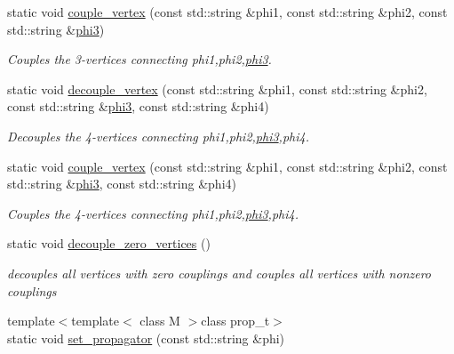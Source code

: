 \begin{DoxyCompactItemize}
static void \hyperlink{a00372_a1ada7c0d83308877cd41c28cf1c89be0}{couple\+\_\+vertex} (const std\+::string \&phi1, const std\+::string \&phi2, const std\+::string \&\hyperlink{a00424}{phi3})
\begin{DoxyCompactList}\small\item\em Couples the 3-\/vertices connecting phi1,phi2,\hyperlink{a00424}{phi3}. \end{DoxyCompactList}\item 
\hypertarget{a00372_a01e88fa34516f9679d742f11856f4611}{}static void \hyperlink{a00372_a01e88fa34516f9679d742f11856f4611}{decouple\+\_\+vertex} (const std\+::string \&phi1, const std\+::string \&phi2, const std\+::string \&\hyperlink{a00424}{phi3}, const std\+::string \&phi4)\label{a00372_a01e88fa34516f9679d742f11856f4611}

\begin{DoxyCompactList}\small\item\em Decouples the 4-\/vertices connecting phi1,phi2,\hyperlink{a00424}{phi3},phi4. \end{DoxyCompactList}\item 
\hypertarget{a00372_a16c864670deb6e9310aa27712dcbdd2c}{}static void \hyperlink{a00372_a16c864670deb6e9310aa27712dcbdd2c}{couple\+\_\+vertex} (const std\+::string \&phi1, const std\+::string \&phi2, const std\+::string \&\hyperlink{a00424}{phi3}, const std\+::string \&phi4)\label{a00372_a16c864670deb6e9310aa27712dcbdd2c}

\begin{DoxyCompactList}\small\item\em Couples the 4-\/vertices connecting phi1,phi2,\hyperlink{a00424}{phi3},phi4. \end{DoxyCompactList}\item 
\hypertarget{a00372_a7f0de2091dea1d3ec92df7456a769e9d}{}static void \hyperlink{a00372_a7f0de2091dea1d3ec92df7456a769e9d}{decouple\+\_\+zero\+\_\+vertices} ()\label{a00372_a7f0de2091dea1d3ec92df7456a769e9d}

\begin{DoxyCompactList}\small\item\em decouples all vertices with zero couplings and couples all vertices with nonzero couplings \end{DoxyCompactList}\item 
\hypertarget{a00372_ac08c09a5b298e2d3abd5beb11ef94701}{}{\footnotesize template$<$template$<$ class M $>$class prop\+\_\+t$>$ }\\static void \hyperlink{a00372_ac08c09a5b298e2d3abd5beb11ef94701}{set\+\_\+propagator} (const std\+::string \&phi)\label{a00372_ac08c09a5b298e2d3abd5beb11ef94701}


\end{DoxyCompactItemize}
